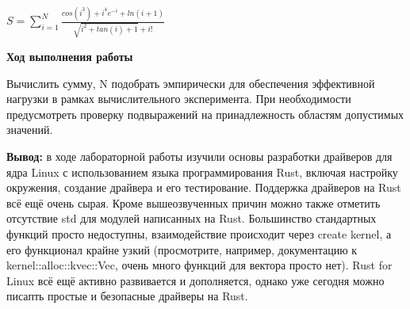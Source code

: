 \documentclass[a4paper,14pt]{extarticle}
\begin{document}
$S = \sum_{i = 1}^{N} \frac{cos(i^3) + i^4 e^{-i} + ln(i + 1)}{\sqrt{i ^ 2 + tan(i) + 1} + i!}$
\begin{center}
\textbf{Ход выполнения работы}
\end{center}

Вычислить сумму, N подобрать эмпирически для обеспечения эффективной нагрузки в
рамках вычислительного эксперимента. При необходимости предусмотреть проверку
подвыражений на принадлежность областям допустимых значений.


\textbf{Вывод: } в ходе лабораторной работы изучили основы разработки драйверов для ядра Linux с использованием языка
программирования Rust, включая настройку окружения, создание драйвера и его тестирование. Поддержка драйверов на Rust 
всё ещё очень сырая. Кроме вышеозвученных причин можно также отметить отсутствие std для модулей написанных на Rust. 
Большинство стандартных функций просто недоступны, взаимодействие происходит через create kernel, а его функционал
крайне узкий (просмотрите, например, документацию к kernel::alloc::kvec::Vec, очень много функций для вектора просто нет).
Rust for Linux всё ещё активно развивается и дополняется, однако уже сегодня можно писапть простые и безопасные драйверы
на Rust.
\end{document}

